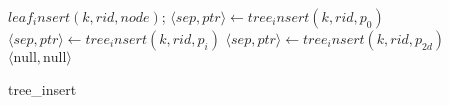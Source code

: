 \documentclass{article}
\begin{document}
		\begin{algorithm}[H]
			\SetAlgoLined
			 {
				\Return $leaf_insert(k, rid, node)$;
			}
			 {
				 {
					$\langle sep, ptr \rangle \leftarrow tree_insert(k, rid, p_0)$
				}
				 {
					$\langle sep, ptr \rangle \leftarrow tree_insert(k, rid, p_i)$
				}
				 {
					$\langle sep, ptr \rangle \leftarrow tree_insert(k, rid, p_{2d})$
				}
			}
			 {
				\Return $\langle \text{null}, \text{null} \rangle$
			} 
			\caption{tree\_insert}
		\end{algorithm}
\end{document}
